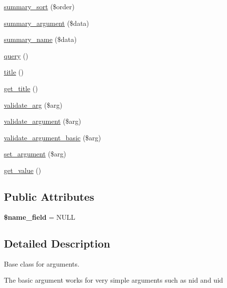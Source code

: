 \begin{CompactItemize}
\item 
\hyperlink{classviews__handler__argument_73f6612542a3ed5a977004f3628bce24}{summary\_\-sort} (\$order)
\item 
\hyperlink{classviews__handler__argument_ad03acefdb44288d7e6c7793bc33f66c}{summary\_\-argument} (\$data)
\item 
\hyperlink{classviews__handler__argument_4c55a340453eed4d35c69f7ac790cac1}{summary\_\-name} (\$data)
\item 
\hyperlink{classviews__handler__argument_c4b0ce6704a10f515b2aea2f9e790994}{query} ()
\item 
\hyperlink{classviews__handler__argument_76181ac24e7be4a09aaafc1fa5f15ea1}{title} ()
\item 
\hyperlink{classviews__handler__argument_45cf1f97b44753f32f6e4af75a4c881f}{get\_\-title} ()
\item 
\hyperlink{classviews__handler__argument_7073b6fd3db280e88bd09d2517a9d767}{validate\_\-arg} (\$arg)
\item 
\hyperlink{classviews__handler__argument_ae090e0aaeabc60dfe06a0c892cabe36}{validate\_\-argument} (\$arg)
\item 
\hyperlink{classviews__handler__argument_b2ca8b443e4b53e1ca532faf0f4565f5}{validate\_\-argument\_\-basic} (\$arg)
\item 
\hyperlink{classviews__handler__argument_b5a0444df1eb5d71720e94a0faa0a34c}{set\_\-argument} (\$arg)
\item 
\hyperlink{classviews__handler__argument_33540b3014b46e56646b03168468b981}{get\_\-value} ()
\end{CompactItemize}
\subsection*{Public Attributes}
\begin{CompactItemize}
\item 
\hypertarget{classviews__handler__argument_9acd19b59a96f8ad33f3643782c8a084}{
\textbf{\$name\_\-field} = NULL}
\label{classviews__handler__argument_9acd19b59a96f8ad33f3643782c8a084}

\end{CompactItemize}


\subsection{Detailed Description}
Base class for arguments.

The basic argument works for very simple arguments such as nid and uid

